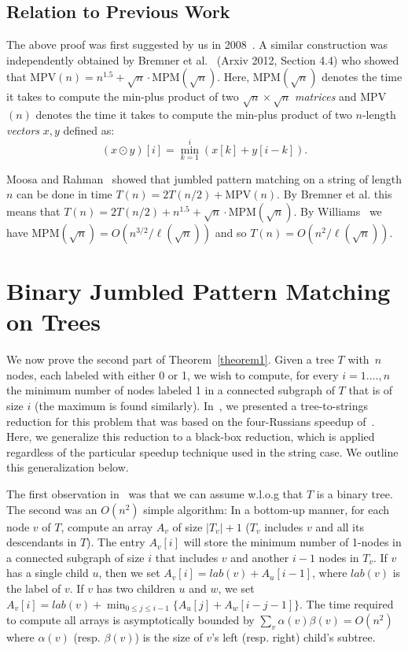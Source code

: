 \documentclass[11pt]{llncs}
\begin{document}
\subsection{Relation to Previous Work}
The above proof was first suggested by us in 2008~\cite{Private2008}. A similar construction was independently obtained by Bremner et al.~\cite{BCDEHILT06} (Arxiv 2012, Section 4.4) who showed that MPV$(n)= n^{1.5} + \sqrt{n}\cdot $MPM$(\sqrt{n})$.  Here, MPM$( \sqrt{n})$ denotes the time it takes to compute the min-plus product of two $ \sqrt{n}\times  \sqrt{n}$ {\em matrices} and  MPV$(n)$ denotes the time it takes to compute the min-plus product of two $n$-length {\em vectors}  $x,y$
defined as: \vspace{-0.07in} \[(x \odot y)[i] = \min_{k=1}^i (x[k]+y[i-k]).\]

Moosa and Rahman~\cite{MR10} showed that jumbled pattern matching on a string of length $n$  can be done in time $T(n) = 2T(n/2) +$MPV$(n)$. By Bremner et al. this means that $T(n) = 2T(n/2) +n^{1.5} + \sqrt{n}\cdot $MPM$(\sqrt{n})$. By
Williams~\cite{Ryan} we have MPM$(\sqrt{n})= O(n^{3/2}/\ell(\sqrt{n}))$ and so $T(n)=O(n^2/\ell(\sqrt{n}))$.




\section{Binary Jumbled Pattern Matching on Trees}

We now prove the second part of Theorem~\ref{theorem1}. Given a tree $T$ with~$n$ nodes, each labeled with either 0 or 1, we wish to compute, for every $i=1.\ldots, n$ the minimum number of nodes labeled 1 in a connected subgraph of $T$ that is of size $i$ (the maximum is found similarly). In~\cite{OurESA13}, we presented a tree-to-strings reduction for this problem that was based on the four-Russians speedup of~\cite{MR12}. Here, we generalize this reduction to a black-box reduction, which is applied regardless of the particular speedup technique used in the string case. We outline this generalization below.

The first observation in~\cite{OurESA13} was that we can assume w.l.o.g that $T$ is a binary tree. The second was an $O(n^2)$ simple algorithm: In a bottom-up manner, for each node $v$ of $T$, compute an array $A_v$ of size $|T_v|+1$ ($T_v$ includes $v$ and all its descendants in $T$). The entry $A_v[i]$ will store the minimum number of 1-nodes in a connected subgraph of size $i$ that includes $v$ and another $i-1$ nodes in $T_v$. If $v$ has a single child $u$, then we set $A_v[i]=lab(v)+A_u[i-1]$, where $lab(v)$ is the label of $v$. If $v$ has two children $u$ and $w$,  we set $A_v[i]= lab(v)+\min_{0 \leq j \leq i-1} \{A_u[j]+A_w[i-j-1]\}$. The time required to compute all arrays is asymptotically bounded by $\sum_v \alpha(v)\beta(v)= O(n^2)$ where $\alpha(v)$ (resp. $\beta(v)$) is the size of $v$'s left (resp. right) child's subtree.
\end{document}
